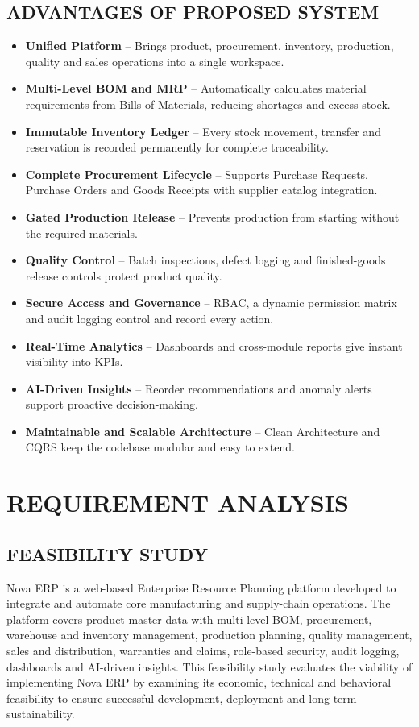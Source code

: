 \documentclass[12pt,a4paper]{report}
\newcommand{\chap}[1]{\chapter{#1}\thispagestyle{empty}\clearpage}
\begin{document}
\section{ADVANTAGES OF PROPOSED SYSTEM}
\begin{itemize}
\item \textbf{Unified Platform} -- Brings product, procurement, inventory, production, quality and sales operations into a single workspace.
\item \textbf{Multi-Level BOM and MRP} -- Automatically calculates material requirements from Bills of Materials, reducing shortages and excess stock.
\item \textbf{Immutable Inventory Ledger} -- Every stock movement, transfer and reservation is recorded permanently for complete traceability.
\item \textbf{Complete Procurement Lifecycle} -- Supports Purchase Requests, Purchase Orders and Goods Receipts with supplier catalog integration.
\item \textbf{Gated Production Release} -- Prevents production from starting without the required materials.
\item \textbf{Quality Control} -- Batch inspections, defect logging and finished-goods release controls protect product quality.
\item \textbf{Secure Access and Governance} -- RBAC, a dynamic permission matrix and audit logging control and record every action.
\item \textbf{Real-Time Analytics} -- Dashboards and cross-module reports give instant visibility into KPIs.
\item \textbf{AI-Driven Insights} -- Reorder recommendations and anomaly alerts support proactive decision-making.
\item \textbf{Maintainable and Scalable Architecture} -- Clean Architecture and CQRS keep the codebase modular and easy to extend.
\end{itemize}

\chap{REQUIREMENT ANALYSIS}

\section{FEASIBILITY STUDY}
Nova ERP is a web-based Enterprise Resource Planning platform developed to integrate and automate core manufacturing and supply-chain operations. The platform covers product master data with multi-level BOM, procurement, warehouse and inventory management, production planning, quality management, sales and distribution, warranties and claims, role-based security, audit logging, dashboards and AI-driven insights. This feasibility study evaluates the viability of implementing Nova ERP by examining its economic, technical and behavioral feasibility to ensure successful development, deployment and long-term sustainability.
\end{document}
